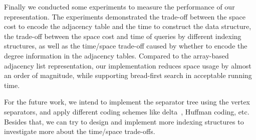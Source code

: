 \documentclass[12pt,glossary]{dalthesis}
\begin{document}
\bigskip
\bigskip

Finally we conducted some experiments to measure the performance of our representation. The experiments demonstrated the trade-off between the space cost to encode the adjacency table and the time to construct the data structure, the trade-off between the space cost and time of queries by different indexing structures, as well as the time/space trade-off caused by whether to encode the degree information in the adjacency tables. Compared to the array-based adjacency list representation, our implementation reduces space usage by almost an order of magnitude, while supporting bread-first search in acceptable running time.

\bigskip
\bigskip

For the future work, we intend to implement the separator tree using the vertex separators, and apply different coding schemes like delta~\cite{Elias}, Huffman coding, etc. Besides that, we can try to design and implement more indexing structures to investigate more about the time/space trade-offs.
 


\end{document}
